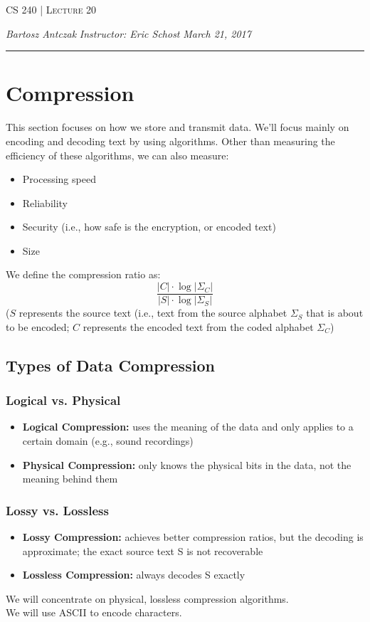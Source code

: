 \documentclass{report}
\newcommand{\lectureNum}{20}
\newcommand{\curDate}{March 21, 2017}
\newcommand{\course}{CS 240}
\begin{document}
\begin{center}
\begin{Large}
\textsc{\course{} | Lecture \lectureNum{}}
\end{Large}
\end{center} 
\noindent \textit{Bartosz Antczak} \hfill
\textit{Instructor: Eric Schost} \hfill
\textit{\curDate{}}
\rule{\textwidth}{0.4pt}
\section{Compression}
This section focuses on how we store and transmit data. We'll focus mainly on encoding and decoding text by using algorithms. Other than measuring the efficiency of these algorithms, we can also measure:
\begin{itemize}
\item Processing speed
\item Reliability
\item Security (i.e., how safe is the encryption, or encoded text)
\item Size
\end{itemize}
We define the compression ratio as:
$$\frac{|C| \cdot \log |\Sigma_C|}{|S| \cdot \log |\Sigma_S|}$$
($S$ represents the source text (i.e., text from the source alphabet $\Sigma_S$ that is about to be encoded; $C$ represents the encoded text from the coded alphabet $\Sigma_C$)
\subsection{Types of Data Compression}
\subsubsection{Logical vs. Physical}
\begin{itemize}
\item \textbf{Logical Compression:} uses the meaning of the data and only applies to a certain domain (e.g., sound recordings)
\item \textbf{Physical Compression:} only knows the physical bits in the data, not the meaning behind them
\end{itemize}
\subsubsection{Lossy vs. Lossless}
\begin{itemize}
\item \textbf{Lossy Compression:} achieves better compression ratios, but the decoding is approximate; the exact source text S is not recoverable
\item \textbf{Lossless Compression:} always decodes S exactly
\end{itemize}
We will concentrate on physical, lossless compression algorithms.\\
We will use ASCII to encode characters.
\end{document}
